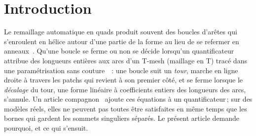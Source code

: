 \documentclass[11pt,a4paper]{article}
\begin{document}
\section{Introduction}

Le remaillage automatique en quads produit souvent des boucles d'arêtes qui
s'enroulent en hélice autour d'une partie de la forme au lieu de se refermer
en anneaux~\cite{bommes2011structure}. Qu'une boucle se ferme ou non se décide
lorsqu'un quantificateur attribue des longueurs entières aux arcs d'un T-mesh
(maillage en T) tracé dans une paramétrisation sans
couture~\cite{campen2015qgp,lyon2021constrained,heistermann2023bimdf}~: une
boucle suit un \emph{tour}, marche en ligne droite à travers les patchs qui
revient à son premier côté, et se ferme lorsque le \emph{décalage} du tour,
une forme linéaire à coefficients entiers des longueurs des arcs, s'annule. Un
article compagnon~\cite{gardent2026loops} ajoute ces équations à un
quantificateur\,; sur des modèles réels, elles ne peuvent pas toutes être
satisfaites en même temps que les bornes qui gardent les sommets singuliers
séparés. Le présent article demande pourquoi, et ce qui s'ensuit.
\end{document}
